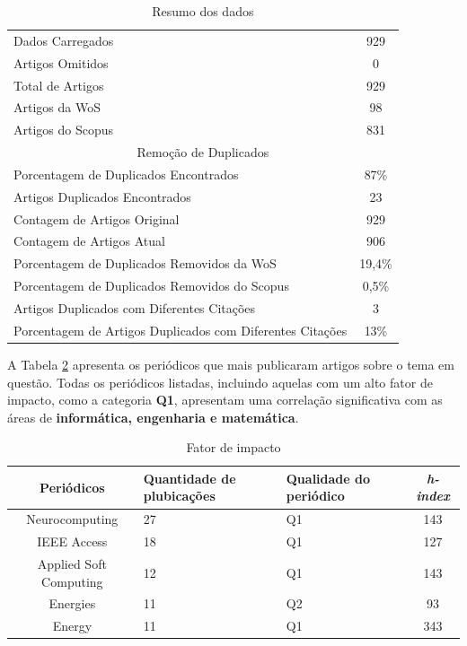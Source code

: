 \begin{table}[H]
	\centering
	\caption{Resumo dos dados}
	\label{tab:resumo}
	\begin{tabular}{lc}
		\hline
		Dados Carregados & 929 \\
		Artigos Omitidos & 0 \\
		Total de Artigos & 929 \\
		Artigos da WoS & 98 \\
		Artigos do Scopus & 831 \\
		\hline
		\multicolumn{2}{c}{Remoção de Duplicados} \\
		\hline
		Porcentagem de Duplicados Encontrados & 87\% \\
		Artigos Duplicados Encontrados & 23 \\
		Contagem de Artigos Original & 929 \\
		Contagem de Artigos Atual & 906 \\
		Porcentagem de Duplicados Removidos da WoS & 19,4\% \\
		Porcentagem de Duplicados Removidos do Scopus & 0,5\% \\
		Artigos Duplicados com Diferentes Citações & 3 \\
		Porcentagem de Artigos Duplicados com Diferentes Citações & 13\% \\
		\hline
	\end{tabular}
	
	 
\end{table}


A Tabela \ref{tb2} apresenta os periódicos que mais publicaram artigos sobre o tema em questão. Todas os periódicos listadas, incluindo aquelas com um alto fator de impacto, como a categoria \textbf{Q1}, apresentam uma correlação significativa com as áreas de \textbf{informática, engenharia e matemática}.

\begin{table}[H]
	\centering
	\caption{Fator de impacto}\label{tb2}
	\begin{tabular}{@{}cp{3cm}p{3cm}c@{}}
		\toprule
		Periódicos      & Quantidade de plubicações & Qualidade do periódico & \textit{h-index} \\\midrule
		Neurocomputing         & 27                         & Q1                     & 143     \\
		IEEE Access            & 18                         & Q1                     & 127     \\
		Applied Soft Computing & 12                         & Q1                     & 143     \\
		Energies               & 11                         & Q2                     & 93      \\
		Energy                 & 11                         & Q1                     & 343     \\ \bottomrule
	\end{tabular}
	
	
	
\end{table}

